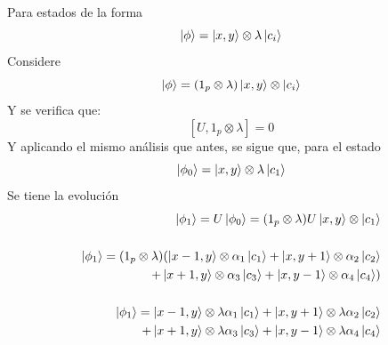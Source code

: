 \documentclass[12pt]{article}
\begin{document}
Para estados de la forma 
\begin{equation}
    \ket{\phi}=\ket{x,y}\otimes \lambda \ket{c_i}
\end{equation}
Considere 
\begin{equation*}
    \ket{\phi}=(1_p\otimes \lambda)\ket{x,y}\otimes \ket{c_i}
\end{equation*}
Y se verifica que: \[[U,1_p\otimes \lambda]=0\]
Y aplicando el mismo análisis que antes, se sigue que, para el estado
\[\ket{\phi_0}=\ket{x,y}\otimes \lambda \ket{c_1}\]
Se tiene la evolución
\begin{align*}
   \ket{\phi_1}= U\ket{\phi_0}=(1_p\otimes \lambda )U\ket{x,y}\otimes \ket{c_1}
   \\
   \\
  \ket{\phi_1} =(1_p\otimes \lambda )(\ket{x-1,y}\otimes \alpha_1 \ket{c_1}+\ket{x,y+1}\otimes \alpha_2 \ket{c_2}
   \\
   +\ket{x+1,y}\otimes \alpha_3 \ket{c_3}+\ket{x,y-1}\otimes \alpha_4 \ket{c_4})
   \\\\
    \ket{\phi_1} =\ket{x-1,y}\otimes \lambda\alpha_1 \ket{c_1}+\ket{x,y+1}\otimes \lambda\alpha_2 \ket{c_2}
   \\
   +\ket{x+1,y}\otimes \lambda\alpha_3 \ket{c_3}+\ket{x,y-1}\otimes \lambda\alpha_4 \ket{c_4}
\end{align*}
\end{document}
